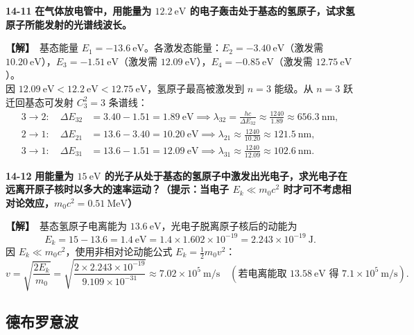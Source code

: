 \documentclass[zihao=5,a4paper,UTF8]{ctexart}
\newenvironment{prob}[2]{%
    \par\vspace{6pt}\noindent\textbf{\color{navy}#1} \textbf{#2}\par\nopagebreak\vspace{2pt}%
}{%
    \par\vspace{4pt}%
}
\newcommand{\sol}{\noindent\textbf{\color{tealaccent}【解】}\ }
\begin{document}
\begin{prob}{14-11}{在气体放电管中，用能量为 $12.2\ \mathrm{eV}$ 的电子轰击处于基态的氢原子，试求氢原子所能发射的光谱线波长。}
\sol 基态能量 $E_1 = -13.6\ \mathrm{eV}$。各激发态能量：$E_2 = -3.40\ \mathrm{eV}$（激发需 $10.20\ \mathrm{eV}$），$E_3 = -1.51\ \mathrm{eV}$（激发需 $12.09\ \mathrm{eV}$），$E_4 = -0.85\ \mathrm{eV}$（激发需 $12.75\ \mathrm{eV}$）。\\
因 $12.09\ \mathrm{eV} < 12.2\ \mathrm{eV} < 12.75\ \mathrm{eV}$，氢原子最高被激发到 $n=3$ 能级。从 $n=3$ 跃迁回基态可发射 $C_3^2 = 3$ 条谱线：
\begin{align*}
    3\to 2:\quad \Delta E_{32} &= 3.40 - 1.51 = 1.89\ \mathrm{eV} \implies \lambda_{32} = \frac{hc}{\Delta E_{32}} \approx \frac{1240}{1.89} \approx 656.3\ \mathrm{nm},\\
    2\to 1:\quad \Delta E_{21} &= 13.6 - 3.40 = 10.20\ \mathrm{eV} \implies \lambda_{21} \approx \frac{1240}{10.20} \approx 121.5\ \mathrm{nm},\\
    3\to 1:\quad \Delta E_{31} &= 13.6 - 1.51 = 12.09\ \mathrm{eV} \implies \lambda_{31} \approx \frac{1240}{12.09} \approx 102.6\ \mathrm{nm}.
\end{align*}
\end{prob}

\begin{prob}{14-12}{用能量为 $15\ \mathrm{eV}$ 的光子从处于基态的氢原子中激发出光电子，求光电子在远离开原子核时以多大的速率运动？（提示：当电子 $E_k \ll m_0 c^2$ 时才可不考虑相对论效应，$m_0 c^2 = 0.51\ \mathrm{MeV}$）}
\sol 基态氢原子电离能为 $13.6\ \mathrm{eV}$，光电子脱离原子核后的动能为
\[
    E_k = 15 - 13.6 = 1.4\ \mathrm{eV} = 1.4\times 1.602\times 10^{-19} = 2.243\times 10^{-19}\ \mathrm{J}.
\]
因 $E_k \ll m_0 c^2$，使用非相对论动能公式 $E_k = \frac{1}{2}m_0 v^2$：
\[
    v = \sqrt{\frac{2E_k}{m_0}} = \sqrt{\frac{2\times 2.243\times 10^{-19}}{9.109\times 10^{-31}}} \approx 7.02\times 10^5\ \mathrm{m/s}\quad (\text{若电离能取 } 13.58\ \mathrm{eV}\text{ 得 } 7.1\times 10^5\ \mathrm{m/s}).
\]
\end{prob}

\subsection{德布罗意波}
\end{document}
